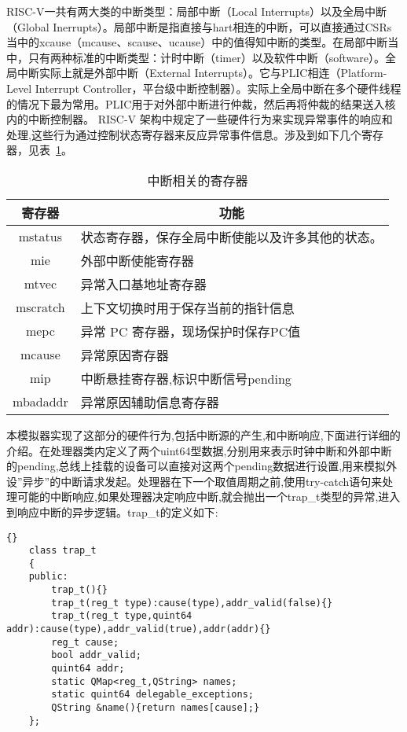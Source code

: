 RISC-V一共有两大类的中断类型：局部中断（Local Interrupts）以及全局中断（Global Inerrupts）。局部中断是指直接与hart相连的中断，可以直接通过CSRs当中的xcause（mcause、scause、ucause）中的值得知中断的类型。在局部中断当中，只有两种标准的中断类型：计时中断（timer）以及软件中断（software）。全局中断实际上就是外部中断（External Interrupts）。它与PLIC相连（Platform-Level Interrupt Controller，平台级中断控制器）。实际上全局中断在多个硬件线程的情况下最为常用。PLIC用于对外部中断进行仲裁，然后再将仲裁的结果送入核内的中断控制器。
RISC-V 架构中规定了一些硬件行为来实现异常事件的响应和处理,这些行为通过控制状态寄存器来反应异常事件信息。涉及到如下几个寄存器，见表~\ref{tab:csr}。
\begin{table}[h]
  \centering
  \caption{中断相关的寄存器}
  \label{tab:csr}
  \begin{tabular}{cl}
    \toprule
寄存器	& \multicolumn{1}{c}{功能}\\
    \midrule
    mstatus	& \multicolumn{1}{m{9cm}}{状态寄存器，保存全局中断使能以及许多其他的状态。}\\ \hline
    mie	& \multicolumn{1}{m{9cm}}{外部中断使能寄存器}\\ \hline
    mtvec	& \multicolumn{1}{m{9cm}}{异常入口基地址寄存器}\\ \hline
    mscratch & \multicolumn{1}{m{9cm}}{上下文切换时用于保存当前的指针信息}\\ \hline
    mepc & \multicolumn{1}{m{9cm}}{异常 PC 寄存器，现场保护时保存PC值}\\ \hline
    mcause & \multicolumn{1}{m{9cm}}{异常原因寄存器}\\ \hline
    mip	& \multicolumn{1}{m{9cm}}{中断悬挂寄存器,标识中断信号pending}\\ \hline
    mbadaddr & \multicolumn{1}{m{9cm}}{异常原因辅助信息寄存器}\\
    \bottomrule
  \end{tabular}
\end{table}

本模拟器实现了这部分的硬件行为,包括中断源的产生,和中断响应,下面进行详细的介绍。在处理器类内定义了两个uint64型数据,分别用来表示时钟中断和外部中断的pending,总线上挂载的设备可以直接对这两个pending数据进行设置,用来模拟外设”异步”的中断请求发起。处理器在下一个取值周期之前,使用try-catch语句来处理可能的中断响应,如果处理器决定响应中断,就会抛出一个trap\_t类型的异常,进入到响应中断的异步逻辑。trap\_t的定义如下:
\clearpage
\begin{lstlisting}{}
    class trap_t
    {
    public:
        trap_t(){}
        trap_t(reg_t type):cause(type),addr_valid(false){}
        trap_t(reg_t type,quint64 addr):cause(type),addr_valid(true),addr(addr){}
        reg_t cause;
        bool addr_valid;
        quint64 addr;
        static QMap<reg_t,QString> names;
        static quint64 delegable_exceptions;
        QString &name(){return names[cause];}
    };        
\end{lstlisting}

